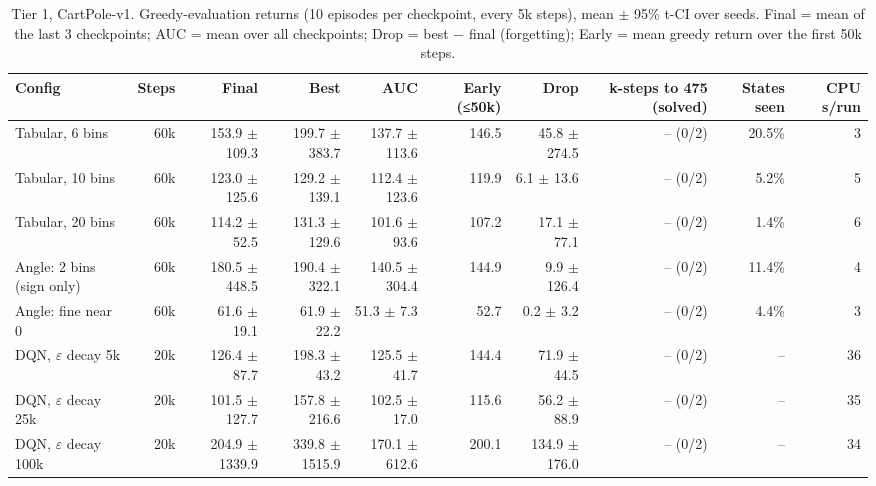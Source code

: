 \begin{table}[t]
\centering\small
\caption{Tier 1, CartPole-v1. Greedy-evaluation returns (10 episodes per checkpoint, every 5k steps), mean $\pm$ 95\% t-CI over seeds. Final = mean of the last 3 checkpoints; AUC = mean over all checkpoints; Drop = best $-$ final (forgetting); Early = mean greedy return over the first 50k steps.}
\label{tab:t1_cartpole}
\begin{tabular}{lrrrrrrrrr}
\toprule
Config & Steps & Final & Best & AUC & Early (≤50k) & Drop & k-steps to 475 (solved) & States seen & CPU s/run \\
\midrule
Tabular, 6 bins & 60k & 153.9 $\pm$ 109.3 & 199.7 $\pm$ 383.7 & 137.7 $\pm$ 113.6 & 146.5 & 45.8 $\pm$ 274.5 & -- (0/2) & 20.5\% & 3 \\
Tabular, 10 bins & 60k & 123.0 $\pm$ 125.6 & 129.2 $\pm$ 139.1 & 112.4 $\pm$ 123.6 & 119.9 & 6.1 $\pm$ 13.6 & -- (0/2) & 5.2\% & 5 \\
Tabular, 20 bins & 60k & 114.2 $\pm$ 52.5 & 131.3 $\pm$ 129.6 & 101.6 $\pm$ 93.6 & 107.2 & 17.1 $\pm$ 77.1 & -- (0/2) & 1.4\% & 6 \\
Angle: 2 bins (sign only) & 60k & 180.5 $\pm$ 448.5 & 190.4 $\pm$ 322.1 & 140.5 $\pm$ 304.4 & 144.9 & 9.9 $\pm$ 126.4 & -- (0/2) & 11.4\% & 4 \\
Angle: fine near 0 & 60k & 61.6 $\pm$ 19.1 & 61.9 $\pm$ 22.2 & 51.3 $\pm$ 7.3 & 52.7 & 0.2 $\pm$ 3.2 & -- (0/2) & 4.4\% & 3 \\
DQN, $\varepsilon$ decay 5k & 20k & 126.4 $\pm$ 87.7 & 198.3 $\pm$ 43.2 & 125.5 $\pm$ 41.7 & 144.4 & 71.9 $\pm$ 44.5 & -- (0/2) & -- & 36 \\
DQN, $\varepsilon$ decay 25k & 20k & 101.5 $\pm$ 127.7 & 157.8 $\pm$ 216.6 & 102.5 $\pm$ 17.0 & 115.6 & 56.2 $\pm$ 88.9 & -- (0/2) & -- & 35 \\
DQN, $\varepsilon$ decay 100k & 20k & 204.9 $\pm$ 1339.9 & 339.8 $\pm$ 1515.9 & 170.1 $\pm$ 612.6 & 200.1 & 134.9 $\pm$ 176.0 & -- (0/2) & -- & 34 \\
\bottomrule
\end{tabular}
\end{table}

